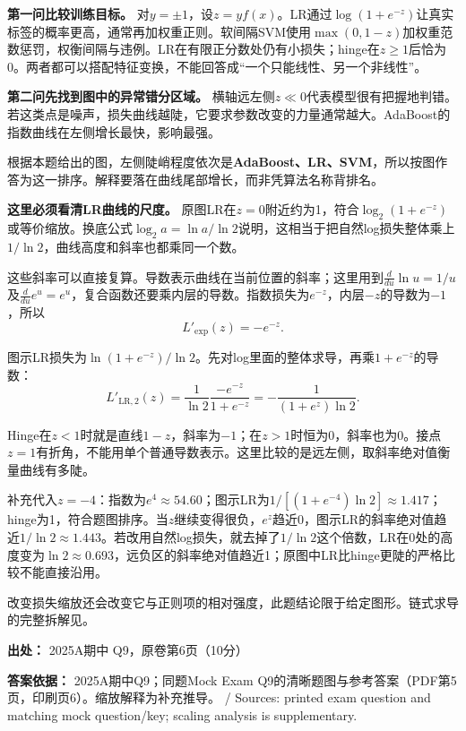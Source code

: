 \textbf{第一问比较训练目标。} 对\(y=\pm1\)，设\(z=yf(x)\)。LR通过\(\log(1+e^{-z})\)让真实标签的概率更高，通常再加权重正则。软间隔SVM使用\(\max(0,1-z)\)加权重范数惩罚，权衡间隔与违例。LR在有限正分数处仍有小损失；hinge在\(z\ge1\)后恰为0。两者都可以搭配特征变换，不能回答成“一个只能线性、另一个非线性”。


\textbf{第二问先找到图中的异常错分区域。} 横轴远左侧\(z\ll0\)代表模型很有把握地判错。若这类点是噪声，损失曲线越陡，它要求参数改变的力量通常越大。AdaBoost的指数曲线在左侧增长最快，影响最强。


根据本题给出的图，左侧陡峭程度依次是\textbf{AdaBoost、LR、SVM}，所以按图作答为这一排序。解释要落在曲线尾部增长，而非凭算法名称背排名。


\textbf{这里必须看清LR曲线的尺度。} 原图LR在\(z=0\)附近约为1，符合\(\log_2(1+e^{-z})\)或等价缩放。换底公式\(\log_2 a=\ln a/\ln2\)说明，这相当于把自然log损失整体乘上\(1/\ln2\)，曲线高度和斜率也都乘同一个数。


这些斜率可以直接复算。导数表示曲线在当前位置的斜率；这里用到\(\frac{d}{du}\ln u=1/u\)及\(\frac{d}{du}e^u=e^u\)，复合函数还要乘内层的导数。指数损失为\(e^{-z}\)，内层\(-z\)的导数为\(-1\)，所以
\[
L'_{\mathrm{exp}}(z)=-e^{-z}.
\]


图示LR损失为\(\ln(1+e^{-z})/\ln2\)。先对log里面的整体求导，再乘\(1+e^{-z}\)的导数：
\[
L'_{\mathrm{LR,2}}(z)
=\frac1{\ln2}\frac{-e^{-z}}{1+e^{-z}}
=-\frac1{(1+e^z)\ln2}.
\]


Hinge在\(z<1\)时就是直线\(1-z\)，斜率为\(-1\)；在\(z>1\)时恒为0，斜率也为0。接点\(z=1\)有折角，不能用单个普通导数表示。这里比较的是远左侧，取斜率绝对值衡量曲线有多陡。


补充代入\(z=-4\)：指数为\(e^4\approx54.60\)；图示LR为\(1/[(1+e^{-4})\ln2]\approx1.417\)；hinge为1，符合题图排序。当\(z\)继续变得很负，\(e^z\)趋近0，图示LR的斜率绝对值趋近\(1/\ln2\approx1.443\)。若改用自然log损失，就去掉了\(1/\ln2\)这个倍数，LR在0处的高度变为\(\ln2\approx0.693\)，远负区的斜率绝对值趋近1；原图中LR比hinge更陡的严格比较不能直接沿用。


改变损失缩放还会改变它与正则项的相对强度，此题结论限于给定图形。链式求导的完整拆解见。


\textbf{出处：} 2025A期中 Q9，原卷第6页（10分）


\textbf{答案依据：} 2025A期中Q9；同题Mock Exam Q9的清晰题图与参考答案（PDF第5页，印刷页6）。缩放解释为补充推导。 / Sources: printed exam question and matching mock question/key; scaling analysis is supplementary.
